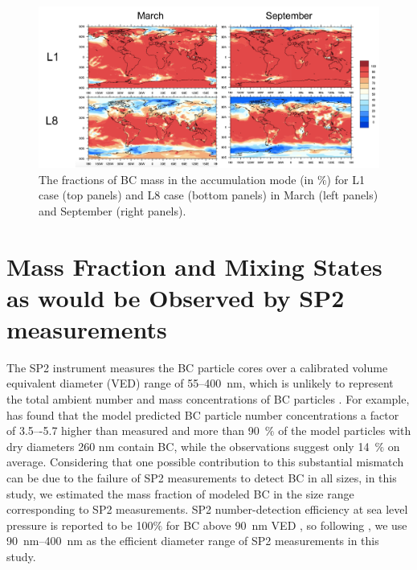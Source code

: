 \documentclass[12pt, fullpage]{uiucthesis2009_2}
\begin{document}
	\begin{figure}[h] 
		\begin{center}
			\includegraphics[width = 1\textwidth]{Figure19}
			\caption[The fractions of BC mass in the accumulation mode (in $\%$) for L1 case (top panels) and L8 case (bottom panels) in March (left panels) and September (right panels)]{\label{fig_P19}The fractions of BC mass in the accumulation mode (in $\%$) for L1 case (top panels) and L8 case (bottom panels) in March (left panels) and September (right panels).}
		\end{center}
	\end{figure}
	
	\section{Mass Fraction and Mixing States as would be Observed by SP2 measurements}
	The SP2 instrument measures the BC particle cores over a calibrated volume equivalent diameter (VED) range of 55--400~nm, which is unlikely to represent the total
	ambient number and mass concentrations of BC particles \citep{Reddington2013}. For example, \citet{Reddington2013} has found that the model predicted BC particle number concentrations a factor of 3.5–-5.7 higher than measured and more than 90~$\%$ of the model particles with dry diameters 260 nm contain BC, while the observations suggest only 14~$\%$ on average. Considering that one possible contribution to this substantial mismatch can be due to the failure of SP2 measurements to detect BC in all sizes, in this study, we estimated the mass fraction of modeled BC in the size range corresponding to SP2 measurements. SP2 number-detection efficiency at sea level pressure is reported to be 100$\%$ for BC above 90~nm VED \citep{schwarz2010global}, so following \citet{Reddington2013}, we use 90~nm--400~nm as the efficient diameter range of SP2 measurements in this study.
	
\end{document}
